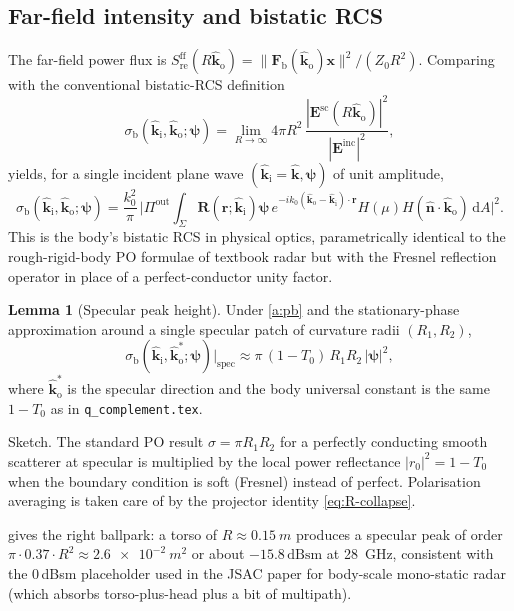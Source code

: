 \documentclass[11pt,a4paper]{article}
\theoremstyle{definition}
\newtheorem{lemma}[lemma]{Lemma}
\newcommand{\khat}{\hat{\bm{k}}}
\newcommand{\nhat}{\hat{\bm{n}}}
\newcommand{\rr}{\mathbf{r}}
\newcommand{\EE}{\mathbf{E}}
\newcommand{\Sref}{S_{\mathrm{re}}}
\newcommand{\diff}{\mathrm{d}}
\newcommand{\kin}{\hat{\bm{k}}_{\mathrm{i}}}
\newcommand{\kout}{\hat{\bm{k}}_{\mathrm{o}}}
\newcommand{\Frib}{\mathbf{F}_{\mathrm{b}}}
\newcommand{\sigb}{\sigma_{\mathrm{b}}}
\begin{document}
\subsection{Far-field intensity and bistatic RCS}

The far-field power flux is
$\Sref^{\mathrm{ff}}(R\kout)=\|\Frib(\kout)\mathbf{x}\|^2/(Z_0 R^2)$.
Comparing with the conventional bistatic-RCS definition
\begin{equation}\label{eq:rcs-def}
  \sigb(\kin,\kout;\bm\psi)=\lim_{R\to\infty}
  4\pi R^2\,\frac{|\EE^{\mathrm{sc}}(R\kout)|^2}{|\EE^{\mathrm{inc}}|^2},
\end{equation}
yields, for a single incident plane wave $(\kin=\khat,\bm\psi)$ of
unit amplitude,
\begin{equation}\label{eq:RCS-PO}
  \boxed{\sigb(\kin,\kout;\bm\psi)=
  \frac{k_0^2}{\pi}\,
  \bigl|\Pi^{\mathrm{out}}\!\!\int_\Sigma\!\!
  \mathbf{R}(\rr;\kin)\bm\psi\,
  e^{-ik_0(\kout-\kin)\cdot\rr}
  H(\mu)H(\nhat\cdot\kout)\,\diff A\bigr|^2.}
\end{equation}
This is the body's bistatic RCS in physical optics, parametrically
identical to the rough-rigid-body PO formulae of textbook radar but
with the Fresnel reflection operator in place of a perfect-conductor
unity factor.

\begin{lemma}[Specular peak height]\label{lem:peak}
Under \ref{a:pb} and the stationary-phase approximation around a
single specular patch of curvature radii $(R_1,R_2)$,
\begin{equation}\label{eq:peak}
  \sigb(\kin,\kout^*;\bm\psi)\big|_{\mathrm{spec}}
  \approx \pi\,(1-T_0)\,R_1 R_2\,|\bm\psi|^2,
\end{equation}
where $\kout^*$ is the specular direction and the body universal
constant is the same $1-T_0$ as in \texttt{q\_complement.tex}.
\end{lemma}

Sketch.  The standard PO result $\sigma=\pi R_1 R_2$ for a perfectly
conducting smooth scatterer at specular is multiplied by the local
power reflectance $|r_0|^2=1-T_0$ when the boundary condition is
soft (Fresnel) instead of perfect.  Polarisation averaging is taken
care of by the projector identity \cref{eq:R-collapse}.

 gives the right ballpark: a torso of $R\approx
\SI{0.15}{m}$ produces a specular peak of order
$\pi\cdot 0.37\cdot R^2\approx \SI{2.6e-2}{m^2}$ or about
$-15.8\,\mathrm{dBsm}$ at \SI{28}{GHz}, consistent with the
$0\,$dBsm placeholder used in the JSAC paper for body-scale
mono-static radar (which absorbs torso-plus-head plus a bit of
multipath).
\end{document}
